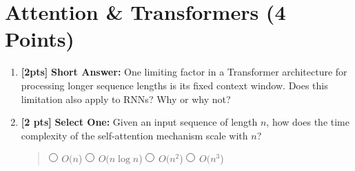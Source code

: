 \section{Attention \& Transformers (4 Points)}

\begin{enumerate}

\item \textbf{[2pts]} \textbf{Short Answer: } One limiting factor in a Transformer architecture for processing longer sequence lengths is its fixed context window. Does this limitation also apply to RNNs? Why or why not?

\begin{tcolorbox}[fit,height=4cm, width=15cm, blank, borderline={1pt}{-2pt},nobeforeafter]
\begin{answer}

\end{answer}
\end{tcolorbox}


\item \textbf{[2 pts]} \textbf{Select One: } Given an input sequence of length $n$, how does the time complexity of the self-attention mechanism scale with $n$?
\begin{quote}
    $\circle$ $O(n$)\newline
    $\circle$ $O(n \log n$)\newline
    $\circle$ $O(n^2$)\newline
    $\circle$ $O(n^3$)
\end{quote}

\end{enumerate}